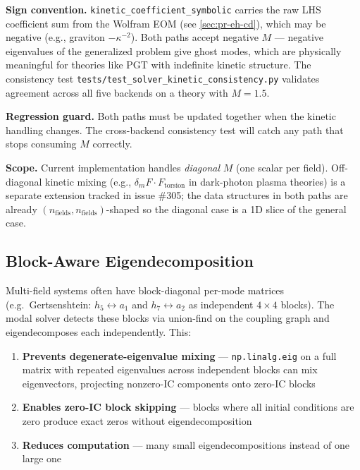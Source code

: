 \textbf{Sign convention.} \texttt{kinetic\_coefficient\_symbolic} carries the raw LHS coefficient sum from the Wolfram EOM (see \cref{sec:pr-eh-cd}), which may be negative (e.g., graviton $-\kappa^{-2}$). Both paths accept negative $M$ --- negative eigenvalues of the generalized problem give ghost modes, which are physically meaningful for theories like PGT with indefinite kinetic structure. The consistency test \texttt{tests/test\_solver\_kinetic\_consistency.py} validates agreement across all five backends on a theory with $M = 1.5$.

\textbf{Regression guard.} Both paths must be updated together when the kinetic handling changes. The cross-backend consistency test will catch any path that stops consuming $M$ correctly.

\textbf{Scope.} Current implementation handles \emph{diagonal} $M$ (one scalar per field). Off-diagonal kinetic mixing (e.g., $\delta_m F \cdot F_{\text{torsion}}$ in dark-photon plasma theories) is a separate extension tracked in issue \#305; the data structures in both paths are already $(n_{\text{fields}}, n_{\text{fields}})$-shaped so the diagonal case is a 1D slice of the general case.

\subsection{Block-Aware Eigendecomposition}
\label{sec:modal-block-aware}

Multi-field systems often have block-diagonal per-mode matrices (e.g.\ Gertsenshtein: $h_5 \leftrightarrow a_1$ and $h_7 \leftrightarrow a_2$ as independent $4\times 4$ blocks). The modal solver detects these blocks via union-find on the coupling graph and eigendecomposes each independently. This:

\begin{enumerate}
  \item \textbf{Prevents degenerate-eigenvalue mixing} --- \texttt{np.linalg.eig} on a full matrix with repeated eigenvalues across independent blocks can mix eigenvectors, projecting nonzero-IC components onto zero-IC blocks
  \item \textbf{Enables zero-IC block skipping} --- blocks where all initial conditions are zero produce exact zeros without eigendecomposition
  \item \textbf{Reduces computation} --- many small eigendecompositions instead of one large one
\end{enumerate}

